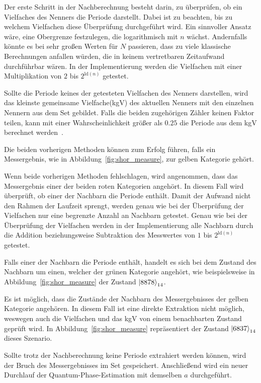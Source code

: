 Der erste Schritt in der Nachberechnung besteht darin, 
zu überprüfen, ob ein Vielfaches des Nenners die Periode darstellt.
Dabei ist zu beachten, bis zu welchem Vielfachen diese Überprüfung durchgeführt wird. 
Ein sinnvoller Ansatz wäre, eine Obergrenze festzulegen, die logarithmisch mit \(n\) wächst.
Andernfalls könnte es bei sehr großen Werten für \(N\) passieren, 
dass zu viele klassische Berechnungen anfallen würden, die in keinem vertretbaren Zeitaufwand durchführbar wären.
In der Implementierung werden die Vielfachen mit einer Multiplikation von \(2\) bis \(2^{\text{ld}(n)}\) getestet.

Sollte die Periode keines der getesteten Vielfachen des Nenners darstellen, 
wird das kleinste gemeinsame Vielfache(kgV) des aktuellen Nenners mit den einzelnen Nennern aus dem Set gebildet.
Falls die beiden zugehörigen Zähler keinen Faktor teilen, 
kann mit einer Wahrscheinlichkeit größer als \(0.25\) die Periode aus dem kgV berechnet werden~\cite[231]{nielsen_chuang_2010}.

Die beiden vorherigen Methoden können zum Erfolg führen, 
falls ein Messergebnis, wie in Abbildung~\ref{fig:shor_measure}, 
zur gelben Kategorie gehört. 

Wenn beide vorherigen Methoden fehlschlagen, 
wird angenommen, dass das Messergebnis einer der beiden roten Kategorien angehört.
In diesem Fall wird überprüft, ob einer der Nachbarn die Periode enthält.
Damit der Aufwand nicht den Rahmen der Laufzeit sprengt, 
werden genau wie bei der Überprüfung der Vielfachen
nur eine begrenzte Anzahl an Nachbarn getestet.
Genau wie bei der Überprüfung der Vielfachen werden in der Implementierung alle Nachbarn durch 
die Addition beziehungsweise Subtraktion des Messwertes von \(1\) bis \(2^{\text{ld}(n)}\) getestet.

Falls einer der Nachbarn die Periode enthält, 
handelt es sich bei dem Zustand des Nachbarn um einen, 
welcher der grünen Kategorie angehört, 
wie beispielsweise in Abbildung~\ref{fig:shor_measure} der Zustand \(\ket{8878}_{14}\).

Es ist möglich, 
dass die Zustände der Nachbarn des Messergebnisses der gelben Kategorie angehören.
In diesem Fall ist eine direkte Extraktion nicht möglich, 
weswegen auch die Vielfachen und das kgV von einem benachbarten Zustand geprüft wird.
In Abbildung~\ref{fig:shor_measure} repräsentiert der Zustand \(\ket{6837}_{14}\) dieses Szenario.

Sollte trotz der Nachberechnung keine Periode extrahiert werden können, 
wird der Bruch des Messergebnisses im Set gespeichert.
Anschließend wird ein neuer Durchlauf der Quantum-Phase-Estimation 
mit demselben \(a\) durchgeführt.

